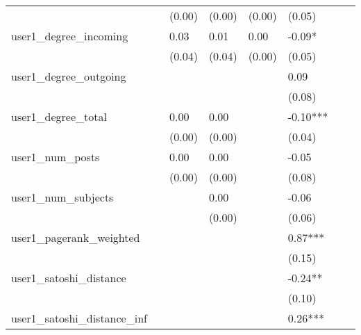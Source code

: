 \begin{table}
\begin{center}
\begin{tabular}{llllllll}
                                               &         & (0.00)  & (0.00)  & (0.00)  & (0.05)      &           &          \\
user1_degree_incoming                          &         & 0.03    & 0.01    & 0.00    & -0.09*      &           &          \\
                                               &         & (0.04)  & (0.04)  & (0.00)  & (0.05)      &           &          \\
user1_degree_outgoing                          &         &         &         &         & 0.09        &           &          \\
                                               &         &         &         &         & (0.08)      &           &          \\
user1_degree_total                             &         & 0.00    & 0.00    &         & -0.10***    &           &          \\
                                               &         & (0.00)  & (0.00)  &         & (0.04)      &           &          \\
user1_num_posts                                &         & 0.00    & 0.00    &         & -0.05       &           &          \\
                                               &         & (0.00)  & (0.00)  &         & (0.08)      &           &          \\
user1_num_subjects                             &         &         & 0.00    &         & -0.06       &           &          \\
                                               &         &         & (0.00)  &         & (0.06)      &           &          \\
user1_pagerank_weighted                        &         &         &         &         & 0.87***     &           &          \\
                                               &         &         &         &         & (0.15)      &           &          \\
user1_satoshi_distance                         &         &         &         &         & -0.24**     &           &          \\
                                               &         &         &         &         & (0.10)      &           &          \\
user1_satoshi_distance_inf                     &         &         &         &         & 0.26***     &           &          \\

\end{tabular}
\end{center}
\end{table}
